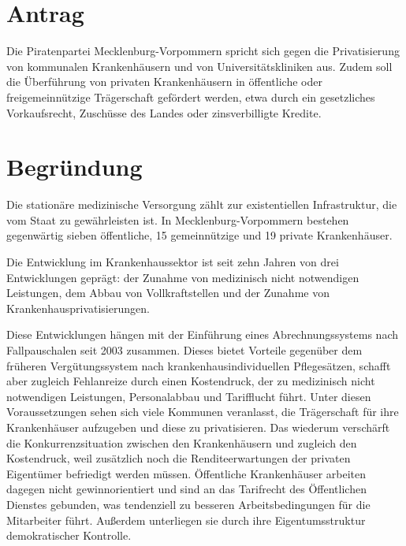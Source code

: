 \section{Antrag}

Die Piratenpartei Mecklenburg-Vorpommern spricht sich gegen die Privatisierung von kommunalen Krankenhäusern und von Universitätskliniken aus. Zudem soll die Überführung von privaten Krankenhäusern in öffentliche oder freigemeinnützige Trägerschaft gefördert werden, etwa durch ein gesetzliches Vorkaufsrecht, Zuschüsse des Landes oder zinsverbilligte Kredite.

\section{Begründung}

Die stationäre medizinische Versorgung zählt zur existentiellen Infrastruktur, die vom Staat zu gewährleisten ist. In Mecklenburg-Vorpommern bestehen gegenwärtig sieben öffentliche, 15 gemeinnützige und 19 private Krankenhäuser.

Die Entwicklung im Krankenhaussektor ist seit zehn Jahren von drei Entwicklungen geprägt: der Zunahme von medizinisch nicht notwendigen Leistungen, dem Abbau von Vollkraftstellen und der Zunahme von Krankenhausprivatisierungen.

Diese Entwicklungen hängen mit der Einführung eines Abrechnungssystems nach Fallpauschalen seit 2003 zusammen. Dieses bietet Vorteile gegenüber dem früheren Vergütungssystem nach krankenhausindividuellen Pflegesätzen, schafft aber zugleich Fehlanreize durch einen Kostendruck, der zu medizinisch nicht notwendigen Leistungen, Personalabbau und Tarifflucht führt. Unter diesen Voraussetzungen sehen sich viele Kommunen veranlasst, die Trägerschaft für ihre Krankenhäuser aufzugeben und diese zu privatisieren. Das wiederum verschärft die Konkurrenzsituation zwischen den Krankenhäusern und zugleich den Kostendruck, weil zusätzlich noch die Renditeerwartungen der privaten Eigentümer befriedigt werden müssen. Öffentliche Krankenhäuser arbeiten dagegen nicht gewinnorientiert und sind an das Tarifrecht des Öffentlichen Dienstes gebunden, was tendenziell zu besseren Arbeitsbedingungen für die Mitarbeiter führt. Außerdem unterliegen sie durch ihre Eigentumsstruktur demokratischer Kontrolle.
